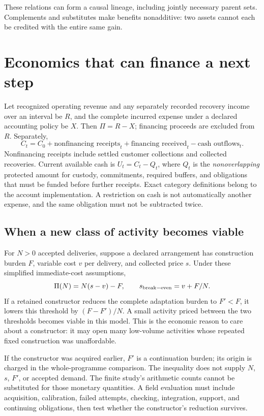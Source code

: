 \documentclass[10pt,a4paper]{article}
\begin{document}
These relations can form a causal lineage, including jointly necessary parent sets. Complements and substitutes make benefits nonadditive: two assets cannot each be credited with the entire same gain.

\section{Economics that can finance a next step}\label{sec:economics}

Let recognized operating revenue and any separately recorded recovery income over an interval be $R$, and the complete incurred expense under a declared accounting policy be $X$. Then $\Pi=R-X$; financing proceeds are excluded from $R$. Separately,
\begin{equation}
C_t=C_0+\text{nonfinancing receipts}_t+\text{financing received}_t
      -\text{cash outflows}_t.
\label{eq:cash}
\end{equation}
Nonfinancing receipts include settled customer collections and collected recoveries. Current available cash is $U_t=C_t-Q_t$, where $Q_t$ is the \emph{nonoverlapping} protected amount for custody, commitments, required buffers, and obligations that must be funded before further receipts. Exact category definitions belong to the account implementation. A restriction on cash is not automatically another expense, and the same obligation must not be subtracted twice.


\subsection{When a new class of activity becomes viable}

For $N>0$ accepted deliveries, suppose a declared arrangement has construction burden $F$, variable cost $v$ per delivery, and collected price $s$. Under these simplified immediate-cost assumptions,
\begin{equation}
 \Pi(N)=N(s-v)-F,\qquad s_{\rm break-even}=v+F/N.
\label{eq:break-even}
\end{equation}
If a retained constructor reduces the complete adaptation burden to $F'<F$, it lowers this threshold by $(F-F')/N$. A small activity priced between the two thresholds becomes viable in this model. This is the economic reason to care about a constructor: it may open many low-volume activities whose repeated fixed construction was unaffordable.

If the constructor was acquired earlier, $F'$ is a continuation burden; its origin is charged in the whole-programme comparison. The inequality does not supply $N$, $s$, $F'$, or accepted demand. The finite study's arithmetic counts cannot be substituted for those monetary quantities. A field evaluation must include acquisition, calibration, failed attempts, checking, integration, support, and continuing obligations, then test whether the constructor's reduction survives.
\end{document}
